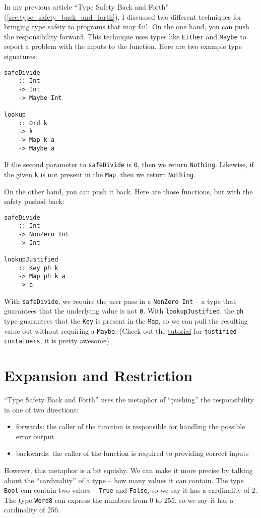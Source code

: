 In my previous article ``Type Safety Back and Forth'' (\ref{sec:type_safety_back_and_forth}), I discussed two different techniques for bringing type safety to programs that may fail. On the one hand, you can push the responsibility forward. This technique uses types like \texttt{Either} and \texttt{Maybe} to report a problem with the inputs to the function. Here are two example type signatures:

\begin{verbatim}
safeDivide
    :: Int
    -> Int
    -> Maybe Int

lookup
    :: Ord k
    => k
    -> Map k a
    -> Maybe a
\end{verbatim}
If the second parameter to \texttt{safeDivide} is \texttt{0}, then we return \texttt{Nothing}. Likewise, if the given \texttt{k} is not present in the \texttt{Map}, then we return \texttt{Nothing}.

On the other hand, you can push it back. Here are those functions, but with the safety pushed back:

\begin{verbatim}
safeDivide
    :: Int
    -> NonZero Int
    -> Int

lookupJustified
    :: Key ph k
    -> Map ph k a
    -> a
\end{verbatim}
With \texttt{safeDivide}, we require the user pass in a \texttt{NonZero Int} -- a type that guarantees that the underlying value is not \texttt{0}. With \texttt{lookupJustified}, the \texttt{ph} type guarantees that the \texttt{Key} is present in the \texttt{Map}, so we can pull the resulting value out without requiring a \texttt{Maybe}. (Check out the \href{https://hackage.haskell.org/package/justified-containers-0.3.0.0/docs/Data-Map-Justified-Tutorial.html}{tutorial} for \texttt{justified-containers}, it is pretty awesome).




\section{Expansion and Restriction}


``Type Safety Back and Forth'' uses the metaphor of ``pushing'' the responsibility in one of two directions:

\begin{itemize}
\item forwards: the caller of the function is responsible for handling the possible error output
\item backwards: the caller of the function is required to providing correct inputs
\end{itemize}
However, this metaphor is a bit squishy. We can make it more precise by talking about the ``cardinality'' of a type -- how many values it can contain. The type \texttt{Bool} can contain two values -- \texttt{True} and \texttt{False}, so we say it has a cardinality of 2. The type \texttt{Word8} can express the numbers from 0 to 255, so we say it has a cardinality of 256.

